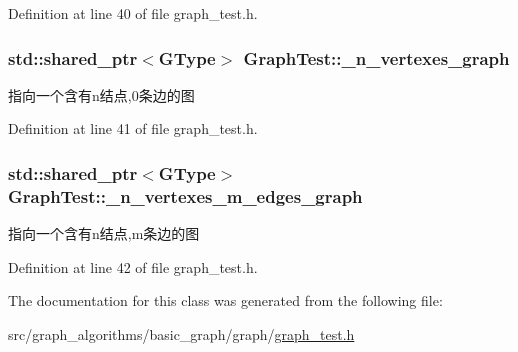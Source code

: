 Definition at line 40 of file graph\+\_\+test.\+h.

\hypertarget{class_graph_test_a2dac828599509e577b5406d06f613a16}{}
\subsubsection[{\+\_\+n\+\_\+vertexes\+\_\+graph}]{\setlength{\rightskip}{0pt plus 5cm}std\+::shared\+\_\+ptr$<${\bf G\+Type}$>$ Graph\+Test\+::\+\_\+n\+\_\+vertexes\+\_\+graph\hspace{0.3cm}{\ttfamily [protected]}}\label{class_graph_test_a2dac828599509e577b5406d06f613a16}
指向一个含有n结点,0条边的图 

Definition at line 41 of file graph\+\_\+test.\+h.

\hypertarget{class_graph_test_aaa662e57a6eb46a91c59464871b4907f}{}
\subsubsection[{\+\_\+n\+\_\+vertexes\+\_\+m\+\_\+edges\+\_\+graph}]{\setlength{\rightskip}{0pt plus 5cm}std\+::shared\+\_\+ptr$<${\bf G\+Type}$>$ Graph\+Test\+::\+\_\+n\+\_\+vertexes\+\_\+m\+\_\+edges\+\_\+graph\hspace{0.3cm}{\ttfamily [protected]}}\label{class_graph_test_aaa662e57a6eb46a91c59464871b4907f}
指向一个含有n结点,m条边的图 

Definition at line 42 of file graph\+\_\+test.\+h.



The documentation for this class was generated from the following file\+:\begin{DoxyCompactItemize}
\item 
src/graph\+\_\+algorithms/basic\+\_\+graph/graph/\hyperlink{graph__test_8h}{graph\+\_\+test.\+h}\end{DoxyCompactItemize}
